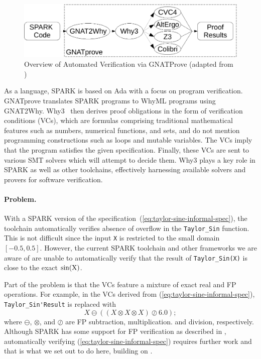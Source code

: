 \documentclass[runningheads]{llncs}
\begin{document}
\begin{figure}[tb]
  \centering
  \includegraphics[width=0.8\hsize]{figures/SPARK_Toolchain-crop.pdf}
  \caption{Overview of Automated Verification via GNATProve (adapted from \cite{fumex_automated_2017})}
  \label{fig:oldGnatprove}
\end{figure}

As a language, SPARK is based on Ada with a focus on program verification.
GNATprove translates SPARK programs to WhyML programs using GNAT2Why.
Why3~\cite{bobot_why3_2011} then derives proof obligations in the form of verification conditions (VCs), which are formulas comprising traditional mathematical features such as numbers, numerical functions, and sets, and do not mention programming constructions such as loops and mutable variables.
The VCs imply that the program satisfies the given specification.
Finally, these VCs are sent to various SMT solvers which will attempt to decide them.
Why3 plays a key role in SPARK as well as other toolchains, effectively harnessing available solvers and provers for software verification.


\paragraph{Problem.}
With a SPARK version of the specification~(\ref{eq:taylor-sine-informal-spec}), the  toolchain automatically verifies absence of overflow in the \lstinline{Taylor_Sin} function.
This is not difficult since the input \lstinline{X} is restricted to the small domain $[-0.5,0.5]$.
However, the current SPARK toolchain and other frameworks we are aware of are unable to automatically verify that the result of \lstinline{Taylor_Sin(X)} is close to the exact $\sin(\text{\lstinline{X}})$.

Part of the problem is that the VCs feature a mixture of exact real and FP operations. 
For example, in the VCs derived from (\ref{eq:taylor-sine-informal-spec}), \lstinline{Taylor_Sin'Result} is replaced with
\[
  X \ominus ((X \otimes X \otimes X) \oslash 6.0);
\]
where $\ominus$, $\otimes$, and $\oslash$ are FP subtraction, multiplication. and division, respectively.
Although SPARK has some support for FP verification as described in \cite{fumex_automated_2017}, automatically verifying (\ref{eq:taylor-sine-informal-spec}) requires further work and that is what we set out to do here, building on \cite{fumex_automated_2017}.
\end{document}
